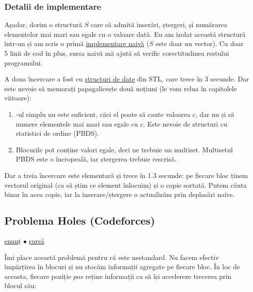 \documentclass[../main.tex]{subfiles}
\begin{document}
\subsubsection*{Detalii de implementare}

Așadar, dorim o structură $S$ care să admită inserări, ștergeri, și numărarea elementelor mai mari sau egale cu o valoare dată. Eu am izolat această structură într-un  și am scris o primă \href{https://github.com/CatalinFrancu/nerdvana/blob/main/problems/spoj/giveaway/2-sqrt-naive.cpp#L9}{implementare naivă} ($S$ este doar un vector). Cu doar 5 linii de cod în plus, sursa naivă mă ajută să verific corectitudinea restului programului.

A doua încercare a fost cu \href{https://github.com/CatalinFrancu/nerdvana/blob/main/problems/spoj/giveaway/3-sqrt-set.cpp}{structuri de date} din STL, care trece în 3 secunde. Dar este nevoie să memorați papagalicește două noțiuni (le vom relua în capitolele viitoare):

\begin{enumerate}
  \item {}-ul simplu nu este suficient, căci el poate să caute valoarea $c$, dar nu și să numere elementele mai mari sau egale cu $c$. Este nevoie de structuri cu statistici de ordine (PBDS).

  \item Blocurile pot conține valori egale, deci ne trebuie un multiset. Multisetul PBDS este o încropeală, iar ștergerea trebuie rescrisă.
\end{enumerate}

Dar a treia încercare este elementară și trece în 1.3 secunde: pe fiecare bloc ținem vectorul original (ca să știm ce element înlocuim) și o copie sortată. Putem căuta binar în acea copie, iar la inserare/ștergere o actualizăm prin deplasări naive.

\subsection{Problema Holes (Codeforces)}
\label{problem:holes}

\href{https://codeforces.com/contest/13/problem/E}{enunț}
$\bullet$
\hyperref[code:holes]{sursă}

Îmi place această problemă pentru că este nestandard. Nu facem efectiv împărțirea în blocuri și nu stocăm informații agregate pe fiecare bloc. În loc de aceasta, fiecare poziție $pos$ reține informații ca să își accelereze trecerea prin blocul său:
\end{document}

